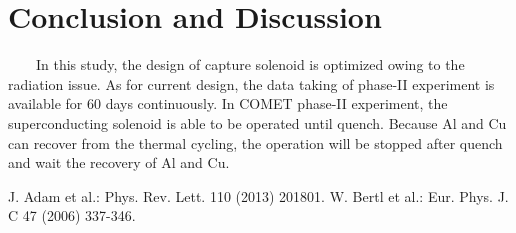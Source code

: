 \documentclass[a4paper, 10pt, twocolumn]{article}
\begin{document}
\section{Conclusion and Discussion}
~~~~In this study, the design of capture solenoid is optimized owing to the radiation issue.
As for current design, the data taking of phase-II experiment is available for 60 days continuously.
In COMET phase-II experiment, the superconducting solenoid is able to be operated until quench.
Because Al and Cu can recover from the thermal cycling, the operation will be stopped after quench and wait the recovery of Al and Cu.

\begin{thebibliography}{10}
	 J. Adam et al.: Phys. Rev. Lett. 110 (2013) 201801.
	 W. Bertl et al.: Eur. Phys. J. C 47 (2006) 337-346.
\end{thebibliography}
\end{document}
